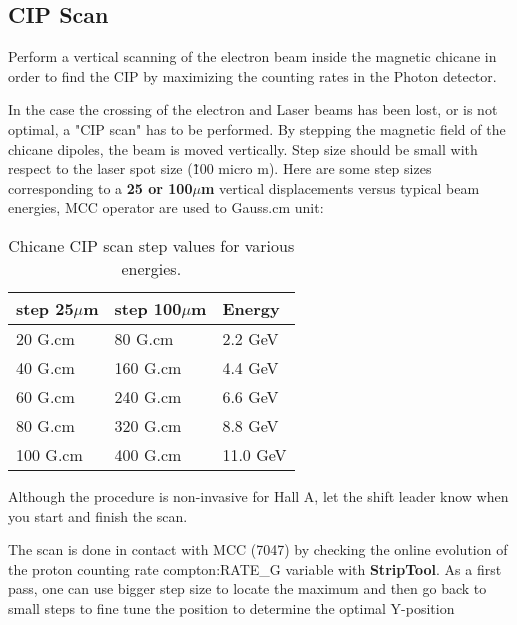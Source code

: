 \subsection{CIP Scan}
Perform a vertical scanning of the electron beam inside the magnetic chicane 
in order to find the CIP by maximizing the counting rates in the Photon detector.

        In the case the crossing of the electron and Laser beams
        has been lost, or is not optimal, a "CIP scan" has to be performed.
        By stepping the magnetic field of the
        chicane dipoles, the beam is moved vertically. Step size should be
        small with respect to the laser spot size (\~100 micro m). Here are some
        step sizes corresponding to a {\bf 25 or 100$\mu$m  } vertical displacements versus
        typical beam energies, MCC operator are used to Gauss.cm unit:
\begin{table}[ht]
\begin{center}
\begin{tabular}{|l|l|l|} \hline
step 25$\mu$m & step 100$\mu$m & Energy \\ \hline\hline
20 G.cm & 80 G.cm & 2.2 GeV \\ \hline
40 G.cm &  160 G.cm &  4.4 GeV \\ \hline
60 G.cm &  240 G.cm & 6.6  GeV \\ \hline
80 G.cm &  320 G.cm &  8.8 GeV \\ \hline
100 G.cm &  400 G.cm &  11.0 GeV \\ \hline 
\end{tabular}
\end{center}
\caption[Compton:vertical scan]{Chicane CIP  scan step values for various energies.
}
\label{tab:compton_vscan}
\end{table}
	
Although the procedure is non-invasive for Hall A, let the shift leader know
when you start and finish the scan.

The scan is done in contact with MCC (7047) by checking the online evolution
        of the proton counting rate compton:RATE\_G variable with  {\bf StripTool}.
        As a first pass, one can use bigger step size to locate
        the maximum and then go back to small steps to fine tune the position to determine 
        the optimal Y-position


